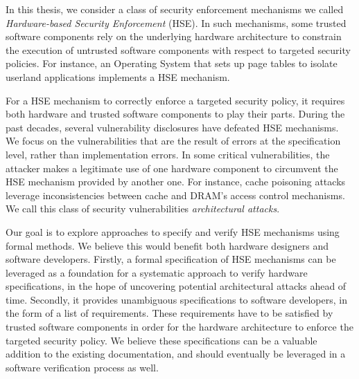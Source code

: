 In this thesis, we consider a class of security enforcement mechanisms we called
\emph{Hardware-based Security Enforcement} (HSE).
%
In such mechanisms, some trusted software components rely on the underlying
hardware architecture to constrain the execution of untrusted software
components with respect to targeted security policies.
%
For instance, an Operating System that sets up page tables to isolate userland
applications implements a HSE mechanism.

For a HSE mechanism to correctly enforce a targeted security policy, it requires
both hardware and trusted software components to play their parts.
%
During the past decades, several vulnerability disclosures have defeated HSE
mechanisms.
%
We focus on the vulnerabilities that are the result of errors at the
specification level, rather than implementation errors.
%
In some critical vulnerabilities, the attacker makes a legitimate use of one
hardware component to circumvent the HSE mechanism provided by another one.
%
For instance, cache poisoning attacks leverage inconsistencies between cache
and DRAM's access control mechanisms.
%
We call this class of security vulnerabilities \emph{architectural attacks}.

Our goal is to explore approaches to specify and verify HSE mechanisms using
formal methods.
%
We believe this would benefit both hardware designers and software developers.
%
Firstly, a formal specification of HSE mechanisms can be leveraged as a
foundation for a systematic approach to verify hardware specifications, in the
hope of uncovering potential architectural attacks ahead of time.
%
Secondly, it provides unambiguous specifications to software developers, in the
form of a list of requirements.
%
These requirements have to be satisfied by trusted software components in order
for the hardware architecture to enforce the targeted security policy.
%
We believe these specifications can be a valuable addition to the existing
documentation, and should eventually be leveraged in a software verification
process as well.

